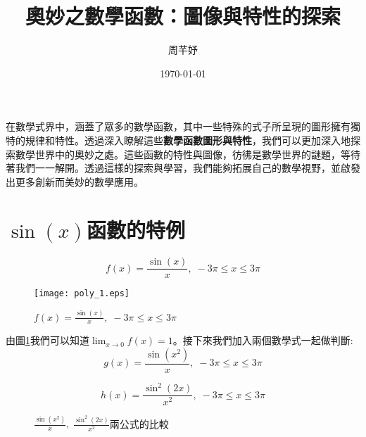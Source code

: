 \documentclass[12pt, a4paper]{article}
\title{奧妙之數學函數：圖像與特性的探索}
\author{{\SM 周芊妤}}
\date{{\TT \today}}
\begin{document}
\maketitle
\fontsize{12}{22 pt}\selectfont

在數學式界中，涵蓋了眾多的數學函數，其中一些特殊的式子所呈現的圖形擁有獨特的規律和特性。透過深入瞭解這些\textbf{數學函數圖形與特性}，我們可以更加深入地探索數學世界中的奧妙之處。這些函數的特性與圖像，彷彿是數學世界的謎題，等待著我們一一解開。透過這樣的探索與學習，我們能夠拓展自己的數學視野，並啟發出更多創新而美妙的數學應用。

\section{$\sin(x)$函數的特例}
\begin{equation}\label{eq:equation_1}
f(x) = \frac{\sin(x)}{x}, \;-3\pi \leq x \leq 3\pi 
\end{equation}

\begin{figure}[H]
\centering
\texttt{[image: poly\_1.eps]}
\caption{$f(x)=\frac{\sin(x)}{x}, \;-3\pi \leq x \leq 3\pi $}
\label{fig:poly_1.eps}
\end{figure}

由圖\;\ref{fig:poly_1.eps}\;我們可以知道\;$ \lim_{x\rightarrow 0} f(x) = 1$。接下來我們加入兩個數學式一起做判斷:
\begin{equation}\label{eq:equation_2}
g(x) = \frac{\sin(x^2)}{x}, \;-3\pi \leq x \leq 3\pi 
\end{equation}

\begin{equation}\label{eq:equation_3}
h(x) = \frac{\sin^2(2x)}{x^2}, \;-3\pi \leq x \leq 3\pi 
\end{equation}

\begin{figure}[H]
\centering
{}
\caption{$\frac{\sin(x^2)}{x},\;\frac{\sin^2(2x)}{x^2}$\;兩公式的比較}
\label{fig:parallel}
\end{figure}
\end{document}
